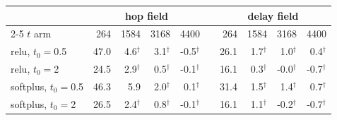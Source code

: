 \begin{tabular}{@{}lrrrrcrrrr@{}}
\toprule
& \multicolumn{4}{c}{hop field} & & \multicolumn{4}{c}{delay field} \\
\cmidrule{2-5}\cmidrule{7-10}
$t$ arm & 264 & 1584 & 3168 & 4400 & & 264 & 1584 & 3168 & 4400 \\
\midrule
relu, $t_0{=}$0.5 & 47.0 & 4.6$^{\dagger}$ & 3.1$^{\dagger}$ & -0.5$^{\dagger}$ & & 26.1 & 1.7$^{\dagger}$ & 1.0$^{\dagger}$ & 0.4$^{\dagger}$ \\
relu, $t_0{=}$2 & 24.5 & 2.9$^{\dagger}$ & 0.5$^{\dagger}$ & -0.1$^{\dagger}$ & & 16.1 & 0.3$^{\dagger}$ & -0.0$^{\dagger}$ & -0.7$^{\dagger}$ \\
softplus, $t_0{=}$0.5 & 46.3 & 5.9 & 2.0$^{\dagger}$ & 0.1$^{\dagger}$ & & 31.4 & 1.5$^{\dagger}$ & 1.4$^{\dagger}$ & 0.7$^{\dagger}$ \\
softplus, $t_0{=}$2 & 26.5 & 2.4$^{\dagger}$ & 0.8$^{\dagger}$ & -0.1$^{\dagger}$ & & 16.1 & 1.1$^{\dagger}$ & -0.2$^{\dagger}$ & -0.7$^{\dagger}$ \\
\bottomrule
\end{tabular}
